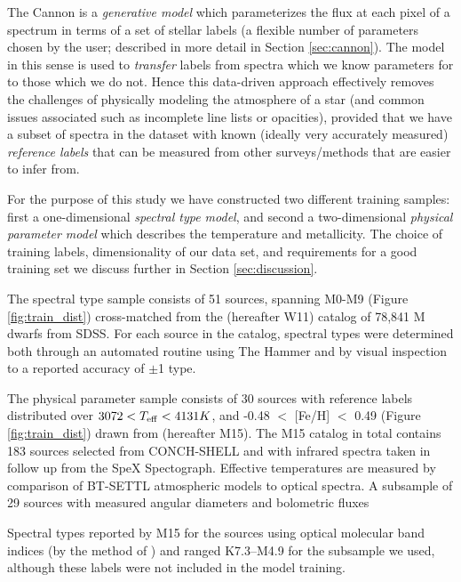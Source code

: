 \documentclass[modern]{aastex62}
\begin{document}
The Cannon is a \emph{generative model} which parameterizes the flux at each pixel of a spectrum in terms of a set of stellar labels (a flexible number of parameters chosen by the user; described in more detail in Section \ref{sec:cannon}). The model in this sense is used to \emph{transfer} labels from spectra which we know parameters for to those which we do not. Hence this data-driven approach effectively removes the challenges of physically modeling the atmosphere of a star (and common issues associated such as incomplete line lists or opacities), provided that we have a subset of spectra in the dataset with known (ideally very accurately measured) \emph{reference labels} that can be measured from other surveys/methods that are easier to infer from. 

For the purpose of this study we have constructed two different training samples: first a one-dimensional \emph{spectral type model}, and second a two-dimensional \emph{physical parameter model} which describes the temperature and metallicity. The choice of training labels, dimensionality of our data set, and requirements for a good training set we discuss further in Section \ref{sec:discussion}.

The spectral type sample consists of 51 sources, spanning M0-M9 (Figure \ref{fig:train_dist}) cross-matched from the \citealt{West:2011} (hereafter W11) catalog of 78,841 M dwarfs from SDSS. For each source in the catalog, spectral types were determined both through an automated routine using The Hammer \citep{Covey:2007} and by visual inspection to a reported accuracy of $\pm$1 type.

The physical parameter sample consists of 30 sources with reference labels distributed over $3072 < T_{\rm eff} < 4131K$, and -0.48 $<$ [Fe/H] $<$ 0.49 (Figure \ref{fig:train_dist}) drawn from \citealt{Mann:2015} (hereafter M15). The M15 catalog in total contains 183 sources selected from CONCH-SHELL \citep{Gaidos:2013} and \citealt{Lepine:2011} \color{red}{these have optical specs?}\color{black} with infrared spectra taken in follow up from the SpeX Spectograph. Effective temperatures are measured by comparison of BT-SETTL atmospheric models \citep{Allard:2011} to optical spectra. A subsample of 29 sources with measured angular diameters and bolometric fluxes

Spectral types reported by M15 for the sources using optical molecular band indices (by the method of \citealt{Lepine:2013}) and ranged K7.3--M4.9 for the subsample we used, although these labels were not included in the model training.
\end{document}
